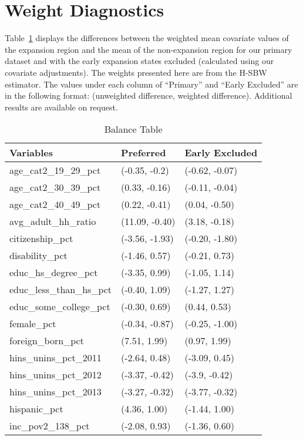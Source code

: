 \section{Weight Diagnostics}
\label{ssec:balancetables}

Table~\ref{tab:baltab1} displays the differences between the weighted mean covariate values of the expansion region and the mean of the non-expansion region for our primary dataset and with the early expansion states excluded (calculated using our covariate adjustments). The weights presented here are from the H-SBW estimator. The values under each column of ``Primary'' and ``Early Excluded'' are in the following format: (unweighted difference, weighted difference). Additional results are available on request.

\begin{table}[ht]
\centering
    \caption{Balance Table}
    \label{tab:baltab1}
\begin{tabular}{lll}
  \hline
Variables & Preferred & Early Excluded \\ 
  \hline
age\_cat2\_19\_29\_pct & (-0.35, -0.2) & (-0.62, -0.07) \\ 
  age\_cat2\_30\_39\_pct & (0.33, -0.16) & (-0.11, -0.04) \\ 
  age\_cat2\_40\_49\_pct & (0.22, -0.41) & (0.04, -0.50) \\ 
  avg\_adult\_hh\_ratio & (11.09, -0.40) & (3.18, -0.18) \\ 
  citizenship\_pct & (-3.56, -1.93) & (-0.20, -1.80) \\ 
  disability\_pct & (-1.46, 0.57) & (-0.21, 0.73) \\ 
  educ\_hs\_degree\_pct & (-3.35, 0.99) & (-1.05, 1.14) \\ 
  educ\_less\_than\_hs\_pct & (-0.40, 1.09) & (-1.27, 1.27) \\ 
  educ\_some\_college\_pct & (-0.30, 0.69) & (0.44, 0.53) \\ 
  female\_pct & (-0.34, -0.87) & (-0.25, -1.00) \\ 
  foreign\_born\_pct & (7.51, 1.99) & (0.97, 1.99) \\ 
  hins\_unins\_pct\_2011 & (-2.64, 0.48) & (-3.09, 0.45) \\ 
  hins\_unins\_pct\_2012 & (-3.37, -0.42) & (-3.9, -0.42) \\ 
  hins\_unins\_pct\_2013 & (-3.27, -0.32) & (-3.77, -0.32) \\ 
  hispanic\_pct & (4.36, 1.00) & (-1.44, 1.00) \\ 
  inc\_pov2\_138\_pct & (-2.08, 0.93) & (-1.36, 0.60) \\ 

\end{tabular}
\end{table}

